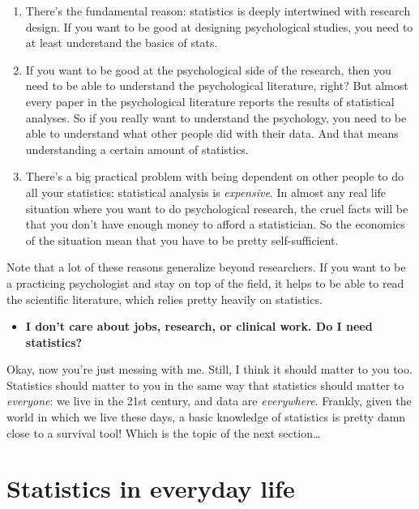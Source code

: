 \documentclass[
]{book}
\providecommand{\tightlist}{%
  \setlength{\itemsep}{0pt}\setlength{\parskip}{0pt}}
\begin{document}
\begin{enumerate}
\def\labelenumi{\arabic{enumi}.}
\item
  There's the fundamental reason: statistics is deeply intertwined with research design. If you want to be good at designing psychological studies, you need to at least understand the basics of stats.
\item
  If you want to be good at the psychological side of the research, then you need to be able to understand the psychological literature, right? But almost every paper in the psychological literature reports the results of statistical analyses. So if you really want to understand the psychology, you need to be able to understand what other people did with their data. And that means understanding a certain amount of statistics.
\item
  There's a big practical problem with being dependent on other people to do all your statistics: statistical analysis is \emph{expensive}. In almost any real life situation where you want to do psychological research, the cruel facts will be that you don't have enough money to afford a statistician. So the economics of the situation mean that you have to be pretty self-sufficient.
\end{enumerate}

Note that a lot of these reasons generalize beyond researchers. If you want to be a practicing psychologist and stay on top of the field, it helps to be able to read the scientific literature, which relies pretty heavily on statistics.

\begin{itemize}
\tightlist
\item
  \textbf{I don't care about jobs, research, or clinical work. Do I need statistics?}
\end{itemize}

Okay, now you're just messing with me. Still, I think it should matter to you too. Statistics should matter to you in the same way that statistics should matter to \emph{everyone}: we live in the 21st century, and data are \emph{everywhere}. Frankly, given the world in which we live these days, a basic knowledge of statistics is pretty damn close to a survival tool! Which is the topic of the next section\ldots{}

\hypertarget{statistics-in-everyday-life}{%
\section{Statistics in everyday life}\label{statistics-in-everyday-life}}
\end{document}
